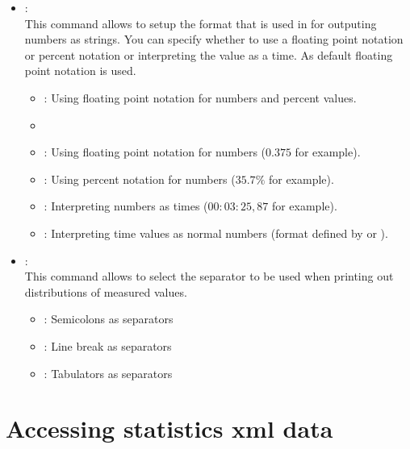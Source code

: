 \begin{itemize}

\item
{}:\\
This command allows to setup the format that is used in  for outputing numbers
as strings. You can specify whether to use a floating point notation or percent notation or interpreting
the value as a time. As default floating point notation is used.
\begin{itemize}
\item
{}:
Using floating point notation for numbers and percent values.
\item
\item
{}:
Using floating point notation for numbers ($0.375$ for example).
\item
{}:
Using percent notation for numbers ($35.7\%$ for example).
\item
{}:
Interpreting numbers as times ($00{:}03{:}25{,}87$ for example).
\item
{}:
Interpreting time values as normal numbers (format defined by  or ).
\end{itemize}
	
\item
{}:\\
This command allows to select the separator to be used when printing out distributions of measured values.
\begin{itemize}
\item
{}:
Semicolons as separators
\item
{}:
Line break as separators
\item
{}:
Tabulators as separators
\end{itemize}

\end{itemize}

\section{Accessing statistics xml data}

